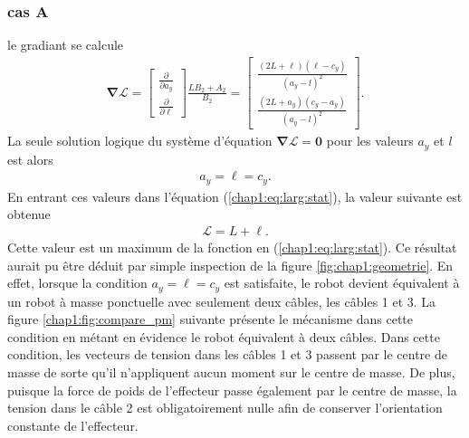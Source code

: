 \subsubsection{cas A}
le gradiant se calcule
\begin{align}
\bm{\nabla} \mathcal{L} =
\begin{bmatrix}
\frac{\partial }{\partial a_y}\\
\frac{\partial }{\partial \ell}
\end{bmatrix}\frac{LB_2+A_2}{B_2} = \begin{bmatrix}
\frac{(2L+\ell)(\ell-c_y)}{(a_y-l)^2}\\
\frac{(2L+a_y)(c_y-a_y)}{(a_y-l)^2}
\end{bmatrix}.
\end{align}
La seule solution logique du système d'équation $\bm{\nabla} \mathcal{L} = \mathbf{0}$ pour les valeurs $a_y$ et $l$ est alors 
\begin{align}
a_y = \ell = c_y.
\end{align}
En entrant ces valeurs dans l'équation (\ref{chap1:eq:larg:stat}), la valeur suivante est obtenue
\begin{align}
\mathcal{L} = L+\ell. 
\end{align}
Cette valeur est un maximum de la fonction en (\ref{chap1:eq:larg:stat}). Ce résultat aurait pu être déduit par simple inspection de la figure \ref{fig:chap1:geometrie}. En effet, lorsque la condition $a_y = \ell = c_y$ est satisfaite, le robot devient équivalent à un robot à masse ponctuelle avec seulement deux câbles, les câbles 1 et 3. La figure \ref{chap1:fig:compare_pm} suivante présente le mécanisme dans cette condition en métant en évidence le robot équivalent à deux câbles. Dans cette condition, les vecteurs de tension dans les câbles 1 et 3 passent par le centre de masse de sorte qu'il n'appliquent aucun moment sur le centre de masse. De plus, puisque la force de poids de l'effecteur passe également par le centre de masse, la tension dans le câble 2 est obligatoirement nulle afin de conserver l'orientation constante de l'effecteur. 

